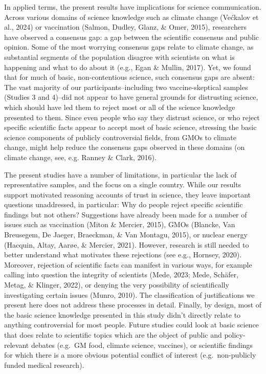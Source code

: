 \documentclass[
  doc,floatsintext]{apa6}
\begin{document}
In applied terms, the present results have implications for science communication. Across various domains of science knowledge such as climate change (Većkalov et al., 2024) or vaccination (Salmon, Dudley, Glanz, \& Omer, 2015), researchers have observed a consensus gap: a gap between the scientific consensus and public opinion. Some of the most worrying consensus gaps relate to climate change, as substantial segments of the population disagree with scientists on what is happening and what to do about it (e.g., Egan \& Mullin, 2017). Yet, we found that for much of basic, non-contentious science, such consensus gaps are absent: The vast majority of our participants--including two vaccine-skeptical samples (Studies 3 and 4)--did not appear to have general grounds for distrusting science, which should have led them to reject most or all of the science knowledge presented to them. Since even people who say they distrust science, or who reject specific scientific facts appear to accept most of basic science, stressing the basic science components of publicly controversial fields, from GMOs to climate change, might help reduce the consensus gaps observed in these domains (on climate change, see, e.g. Ranney \& Clark, 2016).

The present studies have a number of limitations, in particular the lack of representative samples, and the focus on a single country. While our results support motivated reasoning accounts of trust in science, they leave important questions unaddressed, in particular: Why do people reject specific scientific findings but not others? Suggestions have already been made for a number of issues such as vaccination (Miton \& Mercier, 2015), GMOs (Blancke, Van Breusegem, De Jaeger, Braeckman, \& Van Montagu, 2015), or nuclear energy (Hacquin, Altay, Aarøe, \& Mercier, 2021). However, research is still needed to better understand what motivates these rejections (see e.g., Hornsey, 2020). Moreover, rejection of scientific facts can manifest in various ways, for example calling into question the integrity of scientists (Mede, 2023; Mede, Schäfer, Metag, \& Klinger, 2022), or denying the very possibility of scientifically investigating certain issues (Munro, 2010). The classification of justifications we present here does not address these processes in detail. Finally, by design, most of the basic science knowledge presented in this study didn't directly relate to anything controversial for most people. Future studies could look at basic science that does relate to scientific topics which are the object of public and policy-relevant debates (e.g.~GM food, climate science, vaccines), or scientific findings for which there is a more obvious potential conflict of interest (e.g.~non-publicly funded medical research).
\end{document}
